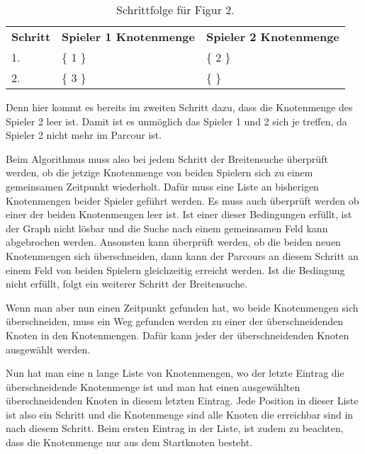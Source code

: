 \documentclass[a4paper,10pt,ngerman]{scrartcl}
\begin{document}
    \begin{table}[htb]
        \centering
        \begin{tabular}{lll}
            \textbf{Schritt} & \textbf{Spieler 1 Knotenmenge} & \textbf{Spieler 2 Knotenmenge} \\
            1.               & \{ 1 \}                        & \{ 2 \}                        \\
            2.               & \{ 3 \}                        & \{  \}                           \\
        \end{tabular}
        \caption{Schrittfolge für Figur 2.}
        \label{tab:Table2}
    \end{table}

    Denn hier kommt es bereits im zweiten Schritt dazu, dass die Knotenmenge des Spieler 2 leer ist.
    Damit ist es unmöglich das Spieler 1 und 2 sich je treffen, da Spieler 2 nicht mehr im Parcour ist.

    Beim Algorithmus muss also bei jedem Schritt der Breitensuche überprüft werden,
    ob die jetzige Knotenmenge von beiden Spielern sich
    zu einem gemeinsamen Zeitpunkt wiederholt.
    Dafür muss eine Liste an bisherigen Knotenmengen beider Spieler geführt werden.
    Es muss auch überprüft werden ob einer der beiden Knotenmengen leer ist.
    Ist einer dieser Bedingungen erfüllt, ist der Graph nicht lösbar
    und die Suche nach einem gemeinsamen Feld kann abgebrochen werden.
    Ansonsten kann überprüft werden,
    ob die beiden neuen Knotenmengen sich überschneiden,
    dann kann der Parcours an diesem Schritt an einem Feld
    von beiden Spielern gleichzeitig erreicht werden.
    Ist die Bedingung nicht erfüllt,
    folgt ein weiterer Schritt der Breitensuche.

    Wenn man aber nun einen Zeitpunkt gefunden hat,
    wo beide Knotenmengen sich überschneiden,
    muss ein Weg gefunden werden zu
    einer der überschneidenden Knoten in den Knotenmengen.
    Dafür kann jeder der überschneidenden Knoten ausgewählt werden.

    Nun hat man eine n lange Liste von Knotenmengen,
    wo der letzte Eintrag die überschneidende Knotenmenge ist
    und man hat einen ausgewählten überschneidenden Knoten in diesem letzten Eintrag.
    Jede Position in dieser Liste ist also ein Schritt
    und die Knotenmenge sind alle Knoten die erreichbar sind in nach diesem Schritt.
    Beim ersten Eintrag in der Liste,
    ist zudem zu beachten,
    dass die Knotenmenge nur aus dem Startknoten besteht.
\end{document}
